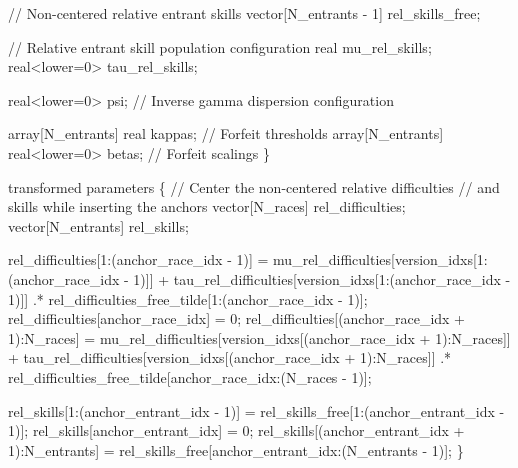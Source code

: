 \documentclass[
  letterpaper,
  DIV=11,
  numbers=noendperiod]{scrartcl}
\newenvironment{Shaded}{\begin{snugshade}}{\end{snugshade}}
\newcommand{\CommentTok}[1]{\textcolor[rgb]{0.37,0.37,0.37}{#1}}
\newcommand{\DataTypeTok}[1]{\textcolor[rgb]{0.68,0.00,0.00}{#1}}
\newcommand{\DecValTok}[1]{\textcolor[rgb]{0.68,0.00,0.00}{#1}}
\newcommand{\KeywordTok}[1]{\textcolor[rgb]{0.00,0.23,0.31}{#1}}
\newcommand{\NormalTok}[1]{\textcolor[rgb]{0.00,0.23,0.31}{#1}}
\begin{document}
\begin{codelisting}
\begin{Shaded}
\begin{Highlighting}[]
  \CommentTok{// Non{-}centered relative entrant skills}
  \DataTypeTok{vector}\NormalTok{[N\_entrants {-} }\DecValTok{1}\NormalTok{] rel\_skills\_free;}

  \CommentTok{// Relative entrant skill population configuration}
  \DataTypeTok{real}\NormalTok{ mu\_rel\_skills;}
  \DataTypeTok{real}\NormalTok{\textless{}}\KeywordTok{lower}\NormalTok{=}\DecValTok{0}\NormalTok{\textgreater{} tau\_rel\_skills;}

  \DataTypeTok{real}\NormalTok{\textless{}}\KeywordTok{lower}\NormalTok{=}\DecValTok{0}\NormalTok{\textgreater{} psi; }\CommentTok{// Inverse gamma dispersion configuration}

  \DataTypeTok{array}\NormalTok{[N\_entrants] }\DataTypeTok{real}\NormalTok{ kappas;         }\CommentTok{// Forfeit thresholds}
  \DataTypeTok{array}\NormalTok{[N\_entrants] }\DataTypeTok{real}\NormalTok{\textless{}}\KeywordTok{lower}\NormalTok{=}\DecValTok{0}\NormalTok{\textgreater{} betas; }\CommentTok{// Forfeit scalings}
\NormalTok{\}}

\KeywordTok{transformed parameters}\NormalTok{ \{}
  \CommentTok{// Center the non{-}centered relative difficulties}
  \CommentTok{// and skills while inserting the anchors}
  \DataTypeTok{vector}\NormalTok{[N\_races] rel\_difficulties;}
  \DataTypeTok{vector}\NormalTok{[N\_entrants] rel\_skills;}

\NormalTok{  rel\_difficulties[}\DecValTok{1}\NormalTok{:(anchor\_race\_idx {-} }\DecValTok{1}\NormalTok{)]}
\NormalTok{    =   mu\_rel\_difficulties[version\_idxs[}\DecValTok{1}\NormalTok{:(anchor\_race\_idx {-} }\DecValTok{1}\NormalTok{)]]}
\NormalTok{      +    tau\_rel\_difficulties[version\_idxs[}\DecValTok{1}\NormalTok{:(anchor\_race\_idx {-} }\DecValTok{1}\NormalTok{)]]}
\NormalTok{        .* rel\_difficulties\_free\_tilde[}\DecValTok{1}\NormalTok{:(anchor\_race\_idx {-} }\DecValTok{1}\NormalTok{)];}
\NormalTok{  rel\_difficulties[anchor\_race\_idx] = }\DecValTok{0}\NormalTok{;}
\NormalTok{  rel\_difficulties[(anchor\_race\_idx + }\DecValTok{1}\NormalTok{):N\_races]}
\NormalTok{    =   mu\_rel\_difficulties[version\_idxs[(anchor\_race\_idx + }\DecValTok{1}\NormalTok{):N\_races]]}
\NormalTok{      +    tau\_rel\_difficulties[version\_idxs[(anchor\_race\_idx + }\DecValTok{1}\NormalTok{):N\_races]]}
\NormalTok{        .* rel\_difficulties\_free\_tilde[anchor\_race\_idx:(N\_races {-} }\DecValTok{1}\NormalTok{)];}

\NormalTok{  rel\_skills[}\DecValTok{1}\NormalTok{:(anchor\_entrant\_idx {-} }\DecValTok{1}\NormalTok{)]}
\NormalTok{    =  rel\_skills\_free[}\DecValTok{1}\NormalTok{:(anchor\_entrant\_idx {-} }\DecValTok{1}\NormalTok{)];}
\NormalTok{  rel\_skills[anchor\_entrant\_idx] = }\DecValTok{0}\NormalTok{;}
\NormalTok{  rel\_skills[(anchor\_entrant\_idx + }\DecValTok{1}\NormalTok{):N\_entrants]}
\NormalTok{    = rel\_skills\_free[anchor\_entrant\_idx:(N\_entrants {-} }\DecValTok{1}\NormalTok{)];}
\NormalTok{\}}


\end{Highlighting}
\end{Shaded}
\end{codelisting}
\end{document}
